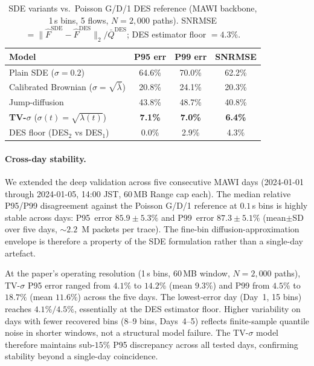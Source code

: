 \documentclass{ieeeaccess}
\begin{document}
\begin{table}[!t]
\caption{SDE variants vs.\ Poisson G/D/1 DES reference (MAWI backbone, 1\,s bins, 5 flows,
$N=2{,}000$ paths). SNRMSE $= \|\hat{F}^{\mathrm{SDE}}-\hat{F}^{\mathrm{DES}}\|_2 /
\bar{Q}^{\mathrm{DES}}$; DES estimator floor $= 4.3\%$.}
\label{tab:sde_des_comparison}
\centering
\begin{tabular}{@{}l c c c@{}}
\toprule
Model & P95 err & P99 err & SNRMSE \\
\midrule
Plain SDE ($\sigma=0.2$)                            & 64.6\% & 70.0\% & 62.2\% \\
Calibrated Brownian ($\sigma=\!\sqrt{\bar\lambda}$) & 20.8\% & 24.1\% & 20.3\% \\
Jump-diffusion                                      & 43.8\% & 48.7\% & 40.8\% \\
\textbf{TV-$\sigma$} ($\sigma(t)=\!\sqrt{\lambda(t)}$) & \textbf{7.1\%} & \textbf{7.0\%} & \textbf{6.4\%} \\
\midrule
DES floor (DES$_2$ vs DES$_1$)                      & 0.0\%  & 2.9\%  & 4.3\% \\
\bottomrule
\end{tabular}
\end{table}

\paragraph{Cross-day stability.}
We extended the deep validation across five consecutive MAWI days (2024-01-01 through 2024-01-05,
14:00 JST, 60\,MB Range cap each). The median relative P95/P99 disagreement against the Poisson
G/D/1 reference at $0.1$\,s bins is highly stable across days: P95~error $85.9\!\pm\!5.3\%$ and
P99~error $87.3\!\pm\!5.1\%$ (mean$\pm$SD over five days, $\sim\!2.2$~M packets per trace). The
fine-bin diffusion-approximation envelope is therefore a property of the SDE formulation rather
than a single-day artefact.

At the paper's operating resolution (1\,s bins, 60\,MB window, $N{=}2{,}000$ paths),
TV-$\sigma$ P95 error ranged from $4.1\%$ to $14.2\%$ (mean $9.3\%$) and P99 from $4.5\%$ to
$18.7\%$ (mean $11.6\%$) across the five days. The lowest-error day (Day~1, 15 bins) reaches
$4.1\%/4.5\%$, essentially at the DES estimator floor. Higher variability on days with fewer
recovered bins (8--9 bins, Days~4--5) reflects finite-sample quantile noise in shorter windows,
not a structural model failure. The TV-$\sigma$ model therefore maintains sub-$15\%$ P95
discrepancy across all tested days, confirming stability beyond a single-day coincidence.
\end{document}
